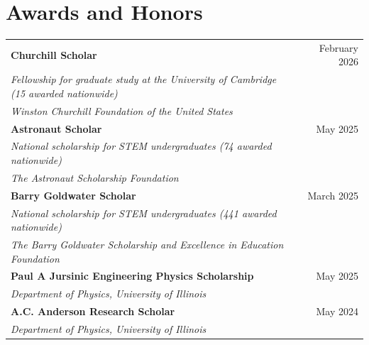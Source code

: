 \documentclass[10pt, letterpaper]{article}
\begin{document}
\section{Awards and Honors}
\vspace{2pt}
\begin{tabularx}{\textwidth}{X r}
\textbf{Churchill Scholar} & February 2026 \\
\textit{Fellowship for graduate study at the University of Cambridge (15 awarded nationwide)} & \\
\textit{Winston Churchill Foundation of the United States} & \\[4pt]

\textbf{Astronaut Scholar} & May 2025 \\
\textit{National scholarship for STEM undergraduates (74 awarded nationwide)} & \\
\textit{The Astronaut Scholarship Foundation} & \\[4pt]

\textbf{Barry Goldwater Scholar} & March 2025 \\
\textit{National scholarship for STEM undergraduates (441 awarded nationwide)} & \\
\textit{The Barry Goldwater Scholarship and Excellence in Education Foundation} & \\[4pt]

\textbf{Paul A Jursinic Engineering Physics Scholarship} & May 2025 \\
\textit{Department of Physics, University of Illinois} & \\[4pt]

\textbf{A.C. Anderson Research Scholar} & May 2024 \\
\textit{Department of Physics, University of Illinois} & \\
\end{tabularx}
\end{document}

